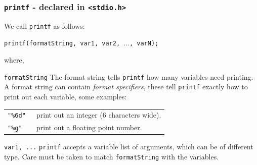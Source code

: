 \documentclass[table]{beamer}
\newif\ifschigh\schighfalse
\newcommand{\kw}[1]{\ifschigh\textcolor{red}{#1}\else\textcolor{keyword}{#1}\fi}
\newcommand{\kt}[1]{\ifschigh\textcolor{red}{#1}\else\textcolor{ctext}{#1}\fi}
\begin{document}

% 
% 

\begin{frame}
\frametitle{{\tt printf} - declared in \kt{\tt <stdio.h>}}
We call {\tt printf} as follows:
\begin{center}
\tt printf(formatString, var1, var2, $\ldots$, varN);
\end{center}
where,
\begin{block}{\tt formatString}
The format string tells {\tt printf} how many variables need printing. A format string can contain \emph{format specifiers}, these tell {\tt printf} exactly how to print out each variable, some examples:
\begin{tabular}{l l}
\tt\kt{"\%6d"} & print out an integer (6 characters wide).\\
\tt\kt{"\%g"} & print out a floating point number.
\end{tabular}
\end{block}
\begin{block}{\tt var1, ...}
{\tt printf} accepts a variable list of arguments, which can be of different type. Care must be taken to match {\tt formatString} with the variables.
\end{block}
\end{frame}
\end{document}
